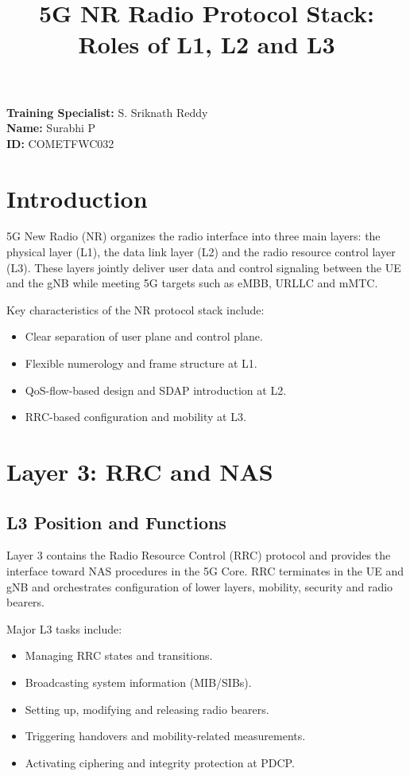 \documentclass[12pt,a4paper]{article}
\title{\textbf{5G NR Radio Protocol Stack:\\Roles of L1, L2 and L3}}
\author{}
\date{}
\begin{document}
\maketitle

\begin{flushright}
\textbf{Training Specialist:} S. Sriknath Reddy\\
\textbf{Name:} Surabhi P\\
\textbf{ID:} COMETFWC032
\end{flushright}

\onehalfspacing

\section{Introduction}

5G New Radio (NR) organizes the radio interface into three main layers: the physical layer (L1), the data link layer (L2) and the radio resource control layer (L3). These layers jointly deliver user data and control signaling between the UE and the gNB while meeting 5G targets such as eMBB, URLLC and mMTC. 

Key characteristics of the NR protocol stack include:
\begin{itemize}
  \item Clear separation of user plane and control plane.
  \item Flexible numerology and frame structure at L1.
  \item QoS-flow-based design and SDAP introduction at L2.
  \item RRC-based configuration and mobility at L3.
\end{itemize}

\section{Layer 3: RRC and NAS}

\subsection{L3 Position and Functions}

Layer 3 contains the Radio Resource Control (RRC) protocol and provides the interface toward NAS procedures in the 5G Core. RRC terminates in the UE and gNB and orchestrates configuration of lower layers, mobility, security and radio bearers.

Major L3 tasks include:
\begin{itemize}
  \item Managing RRC states and transitions.
  \item Broadcasting system information (MIB/SIBs).
  \item Setting up, modifying and releasing radio bearers.
  \item Triggering handovers and mobility-related measurements.
  \item Activating ciphering and integrity protection at PDCP.
\end{itemize}
\end{document}
